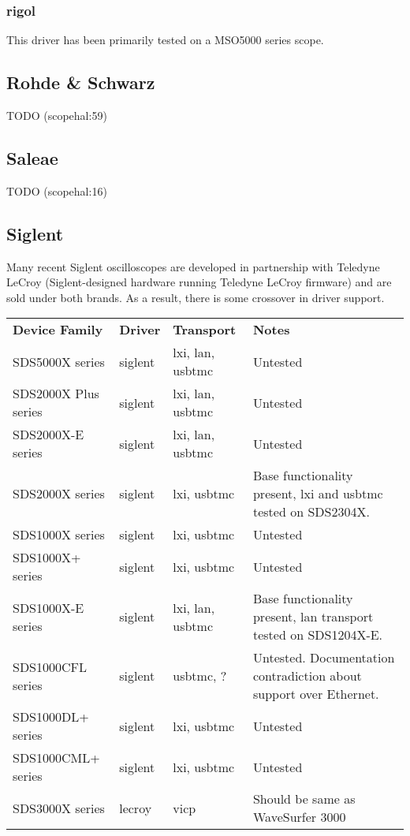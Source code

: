 \subsubsection{rigol}

This driver has been primarily tested on a MSO5000 series scope.

\subsection{Rohde \& Schwarz}
TODO (scopehal:59)

\subsection{Saleae}
TODO (scopehal:16)

\subsection{Siglent}

Many recent Siglent oscilloscopes are developed in partnership with Teledyne LeCroy (Siglent-designed hardware running
Teledyne LeCroy firmware) and are sold under both brands. As a result, there is some crossover in driver support. \\

\begin{tabularx}{16cm}{lllX}
\thickhline
\textbf{Device Family} & \textbf{Driver} & \textbf{Transport} & \textbf{Notes} \\
\thickhline
SDS5000X series & siglent & lxi, lan, usbtmc & Untested \\
\thickhline
SDS2000X Plus series & siglent & lxi, lan, usbtmc & Untested \\
\thickhline
SDS2000X-E series & siglent & lxi, lan, usbtmc & Untested \\
\thickhline
SDS2000X series & siglent & lxi, usbtmc & Base functionality present, lxi and usbtmc tested on SDS2304X. \\
\thickhline
SDS1000X series & siglent & lxi, usbtmc & Untested \\
\thickhline
SDS1000X+ series & siglent & lxi, usbtmc & Untested \\
\thickhline
SDS1000X-E series & siglent & lxi, lan, usbtmc & Base functionality present, lan transport tested on SDS1204X-E.\\
\thickhline
SDS1000CFL series & siglent & usbtmc, ? & Untested. Documentation contradiction about support over Ethernet. \\
\thickhline
SDS1000DL+ series & siglent & lxi, usbtmc & Untested \\
\thickhline
SDS1000CML+ series & siglent & lxi, usbtmc & Untested \\
\thickhline
SDS3000X series & lecroy & vicp & Should be same as WaveSurfer 3000 \\
\end{tabularx}


